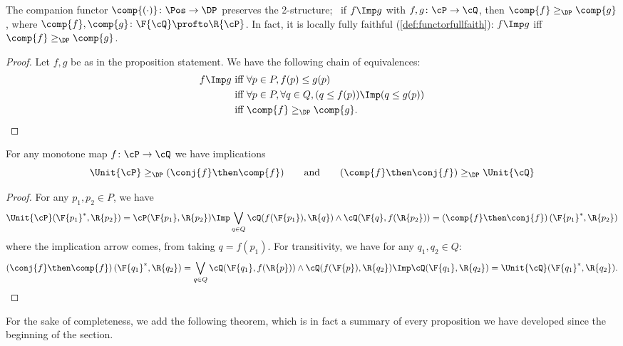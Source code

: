 \begin{proposition}
  \label{prop:companion_2}
  The companion functor $\comp{(\cdot)}\colon\Pos\to\DP$ preserves the 2-structure; \ie \ if $f\Imp g$ with $f,g\colon \cP \to\cQ $, then $\comp{f}\geq_\DP\comp{g}$, where $\comp{f},\comp{g}\colon \F{\cQ} \profto\R{\cP}$. In fact, it is locally fully faithful (\cref{def:functorfullfaith}): $f\Imp g$ iff $\comp{f}\geq_\DP \comp{g}$.
\end{proposition}
\begin{proof}
  Let $f,g$ be as in the proposition statement. We have the following chain of equivalences:
  \begin{equation}
    \begin{aligned}
      f\Imp g&\text{ iff }
      \forall p\in P, f(p)\leq g(p)\\&\text{ iff }
      \forall p\in P, \forall q\in Q, (q\leq f(p))\Imp (q\leq g(p))\\&\text{ iff }
      \comp{f}\geq_\DP \comp{g}.
    \end{aligned}
  \end{equation}
\end{proof}

\begin{proposition}
  \label{prop:comp_conj_adj}
  For any monotone map $f\colon\cP \to\cQ $ we have implications
  \begin{equation}
    \Unit{\cP }\geq_\DP (\conj{f}\then \comp{f})
    \qquad\text{and}\qquad
    (\comp{f}\then \conj{f})\geq_\DP \Unit{\cQ }
  \end{equation}
\end{proposition}
\begin{proof}
  For any $p_1,p_2\in P$, we have
  \begin{equation}
    \Unit{\cP }(\F{p_1}^*,\R{p_2})=\cP (\F{p_1},\R{p_2})
    \Imp\bigvee_{q\in Q}\cQ (f(\F{p_1}),\R{q})\wedge\cQ (\F{q},f(\R{p_2}))=\left(\comp{f}\then \conj{f}\right)(\F{p_1}^*,\R{p_2})
  \end{equation}
  where the implication arrow comes, \eg  from taking $q=f(p_1)$. For transitivity, we have for any $q_1,q_2\in Q$:
  \begin{equation}
    \left(\conj{f}\then \comp{f}\right)(\F{q_1}^*,\R{q_2})=\bigvee_{q\in Q}\cQ (\F{q_1},f(\R{p}))\wedge\cQ (f(\F{p}),\R{q_2})
    \Imp\cQ (\F{q_1},\R{q_2})=\Unit{\cQ }(\F{q_1}^*,\R{q_2}).
  \end{equation}
\end{proof}

For the sake of completeness, we add the following theorem, which is in fact a summary of every proposition we have developed since the beginning of the section.

